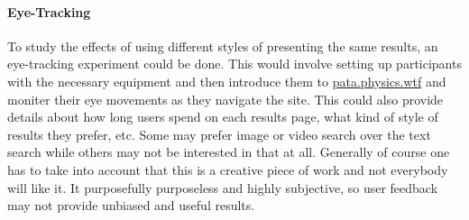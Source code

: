 \paragraph{Eye-Tracking}
To study the effects of using different styles of presenting the same results, an eye-tracking experiment could be done. This would involve setting up participants with the necessary equipment and then introduce them to \url{pata.physics.wtf} and moniter their eye movements as they navigate the site. This could also provide details about how long users spend on each results page, what kind of style of results they prefer, etc. Some may prefer image or video search over the text search while others may not be interested in that at all. Generally of course one has to take into account that this is a creative piece of work and not everybody will like it. It purposefully purposeless and highly subjective, so user feedback may not provide unbiased and useful results.


\stopcontents[chapters]
